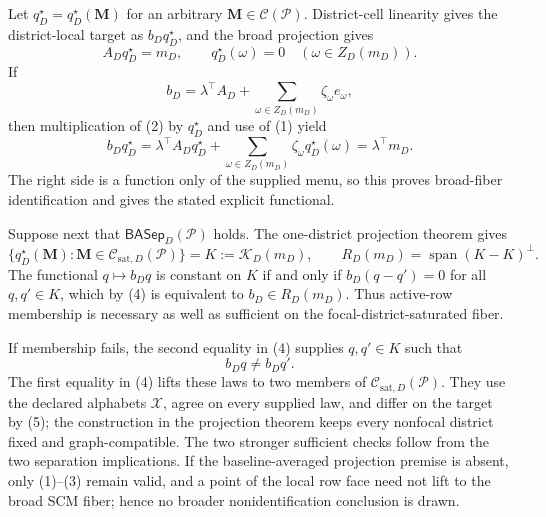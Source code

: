 Let \(q_D^\star=q_D^\star(\mathbf M)\) for an arbitrary \(\mathbf M\in\mathcal C(\mathcal P)\). District-cell linearity gives the district-local target as \(b_Dq_D^\star\), and the broad projection gives
\[
A_Dq_D^\star=m_D,\qquad
q_D^\star(\omega)=0\quad(\omega\in Z_D(m_D)).\tag{1}
\]
If
\[
b_D=\lambda^\top A_D+\sum_{\omega\in Z_D(m_D)}\zeta_\omega e_\omega,\tag{2}
\]
then multiplication of (2) by \(q_D^\star\) and use of (1) yield
\[
b_Dq_D^\star
=\lambda^\top A_Dq_D^\star+\sum_{\omega\in Z_D(m_D)}\zeta_\omega q_D^\star(\omega)
=\lambda^\top m_D.\tag{3}
\]
The right side is a function only of the supplied menu, so this proves broad-fiber identification and gives the stated explicit functional.

Suppose next that \(\mathsf{BASep}_D(\mathcal P)\) holds. The one-district projection theorem gives
\[
\{q_D^\star(\mathbf M):\mathbf M\in\mathcal C_{\mathrm{sat},D}(\mathcal P)\}
=K:=\mathcal K_D(m_D),\qquad
R_D(m_D)=\operatorname{span}(K-K)^\perp.\tag{4}
\]
The functional \(q\mapsto b_Dq\) is constant on \(K\) if and only if
\(b_D(q-q')=0\) for all \(q,q'\in K\), which by (4) is equivalent to
\(b_D\in R_D(m_D)\). Thus active-row membership is necessary as well as sufficient on the focal-district-saturated fiber.

If membership fails, the second equality in (4) supplies \(q,q'\in K\) such that
\[
b_Dq\ne b_Dq'.\tag{5}
\]
The first equality in (4) lifts these laws to two members of
\(\mathcal C_{\mathrm{sat},D}(\mathcal P)\). They use the declared alphabets \(\mathcal X\), agree on every supplied law, and differ on the target by (5); the construction in the projection theorem keeps every nonfocal district fixed and graph-compatible. The two stronger sufficient checks follow from the two separation implications. If the baseline-averaged projection premise is absent, only (1)--(3) remain valid, and a point of the local row face need not lift to the broad SCM fiber; hence no broader nonidentification conclusion is drawn.